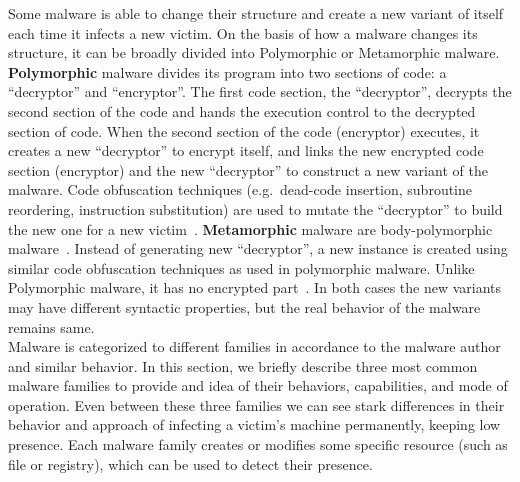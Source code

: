 Some malware is able to change their structure and create a new variant of itself each time it infects a new victim.
On the basis of how a malware changes its structure, it can be broadly divided into Polymorphic or Metamorphic malware.
\textbf{Polymorphic} malware divides its program into two sections of code: a ``decryptor'' and ``encryptor''.
The first code section, the ``decryptor'', decrypts the second section of the code and hands the execution control to the decrypted section of code.
When the second section of the code (encryptor) executes, it creates a new ``decryptor'' to encrypt itself, and links the new encrypted code section (encryptor) and the new ``decryptor'' to construct a new variant of the malware.
Code obfuscation techniques (e.g.\ dead-code insertion, subroutine reordering, instruction substitution) are used to mutate the ``decryptor'' to build the new one for a new victim~\cite[]{rad2011evolution}.
\textbf{Metamorphic} malware are body-polymorphic malware~\cite[]{szor2001hunting}.
Instead of generating new ``decryptor'', a new instance is created using similar code obfuscation techniques as used in polymorphic malware.
Unlike Polymorphic malware, it has no encrypted part~\cite[]{rad2012camouflage}.
In both cases the new variants may have different syntactic properties, but the real behavior of the malware remains same.\\

Malware is categorized to different families in accordance to the malware author and similar behavior.
In this section, we briefly describe three most common malware families to provide and idea of their behaviors, capabilities, and mode of operation.
Even between these three families we can see stark differences in their behavior and approach of infecting a victim's machine permanently, keeping low presence.
Each malware family creates or modifies some specific resource (such as file or registry), which can be used to detect their presence.
